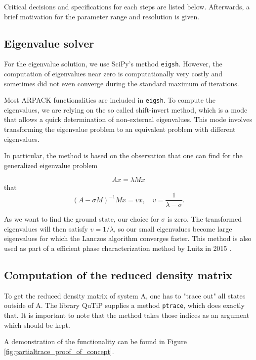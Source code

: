 \documentclass[reprint,amsmath,amssymb,aps,prb]{revtex4-2}
\begin{document}
Critical decisions and specifications for each steps are listed below. Afterwards, a brief motivation for the parameter range and resolution is given.

\subsection{Eigenvalue solver}

For the eigenvalue solution, we use SciPy's method \texttt{eigsh}. However, the computation of eigenvalues near zero is computationally very costly and sometimes did not even converge during the standard maximum of iterations. 

Most ARPACK functionalities are included in \texttt{eigsh}. To compute the eigenvalues, we are relying on the so called shift-invert method, which is a mode that allows a quick determination of non-external eigenvalues. This mode involves transforming the eigenvalue problem to an equivalent problem with different eigenvalues. 

In particular, the method is based on the observation that one can find for the generalized eigenvalue problem

\begin{equation}
Ax=\lambda M x
\end{equation}
that
\begin{equation}
\left(A-\sigma M\right)^{-1}Mx = vx, \quad v=\frac{1}{\lambda-\sigma}.
\end{equation}

As we want to find the ground state, our choice for $\sigma$ is zero. The transformed eigenvalues will then satisfy $v=1/\lambda$, so our small eigenvalues  become large eigenvalues for which the Lanczos algorithm converges faster.\cite{Virtanen_2020} This method is also used as part of a efficient phase characterization method by Luitz in 2015 \cite{Luitz2015}.

\subsection{Computation of the reduced density matrix}

To get the reduced density matrix of system A, one has to "trace out" all states outside of A. The library QuTiP supplies a method \texttt{ptrace}, which does exactly that. It is important to note that the method takes those indices as an argument which should be kept.\cite{Johansson2012}

A demonstration of the functionality can be found in Figure \ref{fig:partialtrace_proof_of_concept}.
\end{document}
